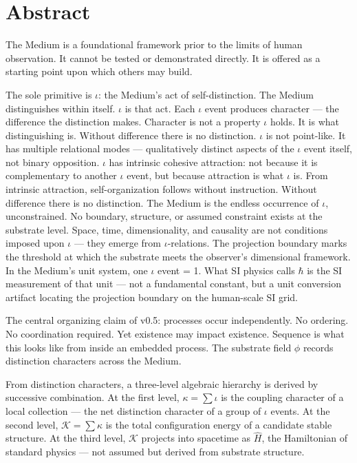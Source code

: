 \documentclass[11pt,letterpaper]{article}
\newcommand{\Kappa}{\mathcal{K}}
\begin{document}
\section{Abstract}
\label{sec:org7b5fd36}

The Medium is a foundational framework prior to the limits of human observation. It cannot be tested or demonstrated directly. It is offered as a starting point upon which others may build.


The sole primitive is \(\iota\): the Medium's act of self-distinction. The Medium distinguishes within itself. \(\iota\) is that act. Each \(\iota\) event produces character --- the difference the distinction makes. Character is not a property \(\iota\) holds. It is what distinguishing is. Without difference there is no distinction. \(\iota\) is not point-like. It has multiple relational modes --- qualitatively distinct aspects of the \(\iota\) event itself, not binary opposition. \(\iota\) has intrinsic cohesive attraction: not because it is complementary to another \(\iota\) event, but because attraction is what \(\iota\) is. From intrinsic attraction, self-organization follows without instruction. Without difference there is no distinction. The Medium is the endless occurrence of \(\iota\), unconstrained. No boundary, structure, or assumed constraint exists at the substrate level. Space, time, dimensionality, and causality are not conditions imposed upon \(\iota\) --- they emerge from \(\iota\)-relations. The projection boundary marks the threshold at which the substrate meets the observer's dimensional framework. In the Medium's unit system, one \(\iota\) event = 1. What SI physics calls \(\hbar\) is the SI measurement of that unit --- not a fundamental constant, but a unit conversion artifact locating the projection boundary on the human-scale SI grid.

The central organizing claim of v0.5: processes occur independently. No ordering. No coordination required. Yet existence may impact existence. Sequence is what this looks like from inside an embedded process. The substrate field \(\phi\) records distinction characters across the Medium.

From distinction characters, a three-level algebraic hierarchy is derived by successive combination. At the first level, \(\kappa = \sum \iota\) is the coupling character of a local collection --- the net distinction character of a group of \(\iota\) events. At the second level, \(\Kappa = \sum \kappa\) is the total configuration energy of a candidate stable structure. At the third level, \(\Kappa\) projects into spacetime as \(\hat{H}\), the Hamiltonian of standard physics --- not assumed but derived from substrate structure.
\end{document}
